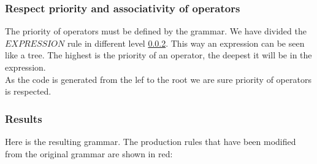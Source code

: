 \subsubsection{Respect priority and associativity of operators}

The priority of operators must be defined by the grammar. We have divided the $EXPRESSION$ rule in different level \ref{expression}. This way an expression can be seen like a tree. The highest is the priority of an operator, the deepest it will be in the expression.\\ As the code is generated from the lef to the root we are sure priority of operators is respected.  



\subsubsection{Results}
\label{expression}
Here is the resulting grammar. The production rules that have been modified from the original grammar are shown in red:


